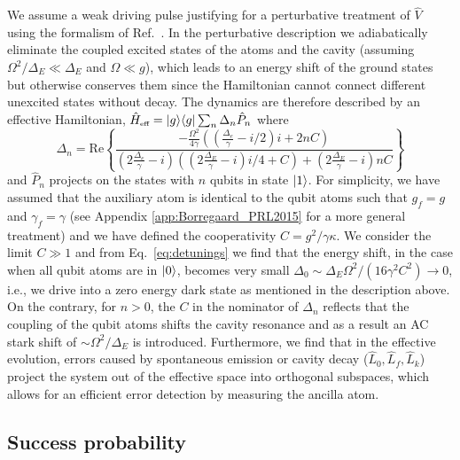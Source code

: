 We assume a weak driving pulse justifying for a perturbative treatment of
$\hat{V}$ using the formalism of Ref.~\cite{Florentin}. In the perturbative
description we adiabatically eliminate the coupled excited states of the atoms
and the cavity (assuming $\Omega^{2}/\Delta_{E}\!\ll\!\Delta_{E}$ and
$\Omega\!\ll\!g$), which leads to an energy shift of the ground states but
otherwise conserves them since the Hamiltonian cannot connect different
unexcited states without decay. The dynamics are therefore described by an
effective Hamiltonian,
$\hat{H}_{\mbox{\tiny eff}}=| g \rangle\langle g |\sum_{n}\Delta_{n}\hat{P}_{n}$ where
\begin{equation}
\Delta_{n}=
\mathrm{Re}\left\{\frac{-\frac{\Omega^{2}}{4\gamma}
((\frac{\Delta_{e}}{\gamma}\!\!-\!\!i/2)i\!\!+\!\!2nC)}
{(2\frac{\Delta_{e}}{\gamma}\!\!-\!\!i)((2\frac{\Delta_{E}}{\gamma}
\!\!-\!\!i)i/4\!\!+\!\!C)\!\!+\!\!(2\frac{\Delta_{E}}{\gamma}\!\!-\!\!i)
nC}\right\}\label{eq:detunings}
\end{equation} 
and $\hat{P}_{n}$ projects on the states with $n$ qubits in state $| 1 \rangle$. For
simplicity, we have assumed that the auxiliary atom is identical to the qubit
atoms such that $g_{f}=g$ and $\gamma_{f}=\gamma$ (see Appendix
\ref{app:Borregaard_PRL2015} for a more general treatment) and we have defined
the cooperativity $C=g^{2}/\gamma\kappa$.
We consider the limit $C\gg1$ and from Eq.~\eqref{eq:detunings} we find that the
energy shift, in the case when all qubit atoms are in $| 0 \rangle$, becomes very
small $\Delta_{0}\sim\Delta_{E}\Omega^{2}/(16\gamma^{2} C^{2})\rightarrow 0$,
i.e., we drive into a zero energy dark state as mentioned in the description
above.
On the contrary, for $n>0$, the $C$ in the nominator of $\Delta_{n}$ reflects
that the coupling of the qubit atoms shifts the cavity resonance and as a result
an AC stark shift of $\sim\Omega^{2}/\Delta_{E}$ is introduced.
Furthermore, we find that in the effective evolution, errors caused by
spontaneous emission or cavity decay ($\hat{L}_{0},\hat{L}_{f},\hat{L}_{k}$)
project the system out of the effective space into orthogonal subspaces, which
allows for an efficient error detection by measuring the ancilla atom.

\subsection{Success probability}

